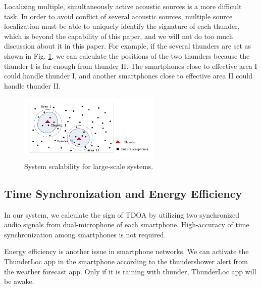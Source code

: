 Localizing multiple, simultaneously active acoustic sources is a more difficult task. 
In order to avoid conflict of several acoustic sources, 
multiple source localization must be able to uniquely identify the signature of each thunder, 
which is beyond the capability of this paper, and we will not do too much discussion about it in this paper. 
For example, if the several thunders are set as shown in Fig. \ref{multiple_source_localization},
we can calculate the positions of the two thunders because the thunder I is far enough from thunder II. 
The smartphones close to effective area I could handle thunder I, and another smartphones close to effective area II could handle thunder II. 

  \begin{figure}[ht]
            \setlength{\abovecaptionskip}{0pt}
            \centering
            \includegraphics[scale=1.2,height=3.2cm]{fig/msl.pdf}
             \vspace{1mm}
			\caption{\label{Fig9:} System scalability for large-scale systems.}
            \label{multiple_source_localization}
            \vspace{-1mm}
  \end{figure}

 \vspace{-8mm}
 
\subsection{Time Synchronization and Energy Efficiency}
In our system, we calculate the sign of TDOA by utilizing two synchronized audio signals from dual-microphone of each smartphone. 
High-accuracy of time synchronization among smartphones is not required.

Energy efficiency is another issue in smartphone networks.
We can activate the ThunderLoc app in the smartphone according to the thundershower alert from the weather forecast app.
Only if it is raining with thunder, ThunderLoc app will be awake.






